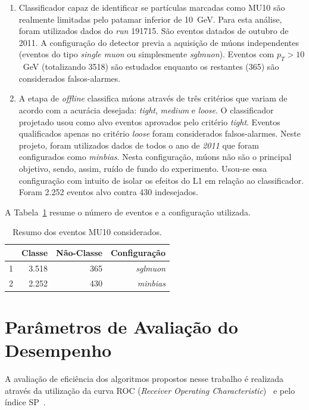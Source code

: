 \begin{enumerate}
    \item Classificador capaz de identificar se partículas marcadas como MU10 são
    realmente limitadas pelo patamar inferior de 10~GeV. Para esta análise, foram
    utilizados dados do \emph{run} 191715. São eventos datados de outubro de 2011. A
    configuração do detector previa a aquisição de múons independentes (eventos do
    tipo \emph{single muon} ou simplesmente \emph{sglmuon}). Eventos com $p_T >
    10$~GeV (totalizando 3518) são estudados enquanto os restantes (365) são
    considerados falsos-alarmes.

    \item A etapa de  \emph{offline} classifica múons através de três critérios
    que variam de acordo com a acurácia desejada: \emph{tight}, \emph{medium} e
    \emph{loose}. O classificador projetado usou como alvo eventos aprovados
    pelo critério \emph{tight}. Eventos qualificados apenas no critério
    \emph{loose} foram considerados falsos-alarmes.  Neste projeto, foram
    utilizados dados de todos o ano de \emph{2011} que foram configurados como
    \emph{minbias}. Nesta configuração, múons não são o principal objetivo,
    sendo, assim, ruído de fundo do experimento. Usou-se essa configuração com
    intuito de isolar os efeitos do L1 em  relação ao classificador. Foram 2.252
    eventos alvo contra
    430 indesejados.

\end{enumerate}

A Tabela~\ref{table:Classes} resume o número de eventos e a configuração
utilizada.

\begin{table}[htbp!]
  \centering
  \begin{tabular}{ l  r  r  r  }
      \toprule
                         & Classe & Não-Classe & Configuração\\
      \midrule
        1 & 3.518  & 365 & \emph{sglmuon} \\
        2 & 2.252 & 430 &  \emph{minbias} \\ 
      \bottomrule
  \end{tabular}
  \caption{Resumo dos eventos MU10 considerados.}
  \label{table:Classes}

\end{table}



\section{Parâmetros de Avaliação do Desempenho}
\label{sec:performance_indexes}
A avaliação de eficiência dos algoritmos propostos nesse trabalho é realizada
através da utilização da curva ROC (\emph{Receiver Operating
Characteristic})~\cite{TREES2001} e pelo índice SP~\cite{ref:SIMAS}.

